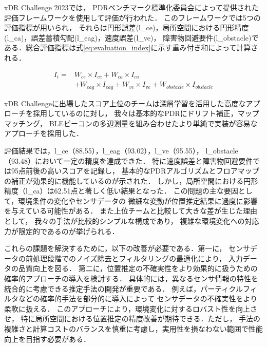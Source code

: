 xDR Challenge 2023では，
PDRベンチマーク標準化委員会によって提供された評価フレームワークを使用して評価が行われた．
このフレームワークでは5つの評価指標が用いられ，
それらは円形誤差(l\_ce)，局所空間における円形精度(l\_ca)，誤差蓄積勾配(l\_eag)，速度誤差(l\_ve)，
障害物回避要件(l\_obstacle)である．総合評価指標は式\ref{eq:evaluation_index}に示す重み付き和によって計算される．

\begin{equation}
	\begin{aligned}
		I_i = & W_{ce} \times I_{ce} + W_{ca} \times I_{ca}                                        \\
		      & + W_{eag} \times I_{eag} + W_{ve} \times I_{ve} + W_{obstacle} \times I_{obstacle}
	\end{aligned}
	\label{eq:evaluation_index}
\end{equation}

xDR Challengeに出場したスコア上位のチームは深層学習を活用した高度なアプローチを採用しているのに対し，
我々は基本的なPDRにドリフト補正，マップマッチング，
BLEビーコンの多辺測量を組み合わせたより単純で実装が容易なアプローチを採用した．

評価結果では，l\_ce（88.55），l\_eag（93.02），l\_ve（95.55），
l\_obstacle（93.48）において一定の精度を達成できた．
特に速度誤差と障害物回避要件では95点前後の高いスコアを記録し，
基本的なPDRアルゴリズムとフロアマップの補正が効果的に機能しているのが示された．
しかし，局所空間における円形精度（l\_ca）は62.51点と著しく低い結果となった．
この問題の主な要因として，環境条件の変化やセンサデータの
微細な変動が位置推定結果に過度に影響を与えている可能性がある．
また上位チームと比較して大きな差が生じた理由として，
我々の手法が比較的シンプルな構成であり，
複雑な環境変化への対応力が限定的であるのが挙げられる．

これらの課題を解決するために，以下の改善が必要である．第一に，
センサデータの前処理段階でのノイズ除去とフィルタリングの最適化により，
入力データの品質向上を図る．
第二に，位置推定の不確実性をより効果的に扱うための確率的アプローチの導入を検討する．
具体的には，異なるセンサ情報の特性を統合的に考慮できる推定手法の開発が重要である．
例えば，パーティクルフィルタなどの確率的手法を部分的に導入によって
センサデータの不確実性をより柔軟に扱える．
このアプローチにより，環境変化に対するロバスト性を向上させ，
特に局所空間における位置推定の精度改善が期待できる．ただし，
手法の複雑さと計算コストのバランスを慎重に考慮し，実用性を損なわない範囲で性能向上を目指す必要がある．

